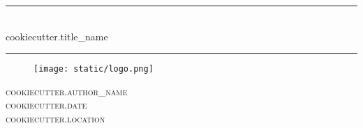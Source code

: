 \begin{titlepage}

  \begin{center}

    \noindent\rule{\textwidth}{1pt}
    \\[0.25cm]
    {
    \fontsize{35pt}{35pt}\selectfont
    {
      {{cookiecutter.title_name}}
    }
    }
    \noindent\rule{\textwidth}{1pt}

    \vspace{2cm}
    \begin{figure}[h]
      \centering
      \texttt{[image: static/logo.png]}
    \end{figure}
    \vspace{1cm}

    \vspace{1.5cm}
    \textsc{\Large
      {{cookiecutter.author_name}}
    }\\[2cm]

    \textsc{\large
      {{cookiecutter.date}}
    }\\[0.25cm]


    \textsc{\large
      {{cookiecutter.location}}
    }\\[0.25cm]

  \end{center}
\end{titlepage}
